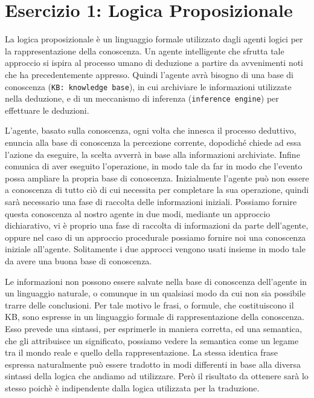 \raggedright
{}
	\label{ch:cc}
	\section{Esercizio 1: Logica Proposizionale}
		\label{sec:es1}
		La logica proposizionale è un linguaggio formale utilizzato dagli agenti logici per la rappresentazione della conoscenza. Un agente intelligente che sfrutta tale approccio si ispira al processo umano di deduzione a partire da avvenimenti noti che ha precedentemente appresso. Quindi l'agente avrà bisogno di una base di conoscenza (\texttt{KB: knowledge base}), in cui archiviare le informazioni utilizzate nella deduzione, e di un meccanismo di inferenza (\texttt{inference engine}) per effettuare le deduzioni.
		\par
		L'agente, basato sulla conoscenza, ogni volta che innesca il processo deduttivo, enuncia alla base di conoscenza la percezione corrente, dopodiché chiede ad essa l'azione da eseguire, la scelta avverrà in base alla informazioni archiviate. Infine comunica  di aver eseguito l'operazione, in modo tale da far in modo che l'evento possa ampliare la propria base di conoscenza. Inizialmente l'agente può non essere a conoscenza di tutto ciò di cui necessita per completare la sua operazione, quindi sarà necessario una fase di raccolta delle informazioni iniziali. Possiamo fornire questa conoscenza al nostro agente in due modi, mediante un approccio dichiarativo, vi è proprio una fase di raccolta di informazioni da parte dell'agente, oppure nel caso di un approccio procedurale possiamo fornire noi una conoscenza iniziale all'agente. Solitamente i due approcci vengono usati insieme in modo tale da avere una buona base di conoscenza.
		\par
		Le informazioni non possono essere salvate nella base di conoscenza dell'agente in un linguaggio naturale, o comunque in un qualsiasi modo da cui non sia possibile trarre delle conclusioni. Per tale motivo le frasi, o formule, che costituiscono il KB, sono espresse in un linguaggio formale di rappresentazione della conoscenza. Esso prevede una sintassi, per esprimerle in maniera corretta, ed una semantica, che gli attribuisce un significato, possiamo vedere la semantica come un legame tra il mondo reale e quello della rappresentazione.
		La stessa identica frase espressa naturalmente può essere tradotto in modi differenti in base alla diversa sintassi della logica che andiamo ad utilizzare. Però il risultato da ottenere sarà lo stesso poichè è indipendente dalla logica utilizzata per la traduzione.
